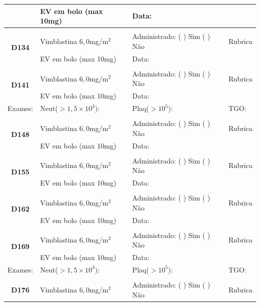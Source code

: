 \documentclass[11pt,a4paper,oldfontcommands]{memoir}
\begin{document}
\begin{center}
\begin{longtable}{p{1cm}p{5cm}|p{5cm}|p{3cm}}
    \multicolumn{1}{c|}{}&{EV em bolo (max 10mg)}&{Data:}&\\
    \hline
    \\
    \hline
    \multicolumn{1}{c|}{\multirow{2}{*}{\textbf{D134}}}&{Vimblastina \(6,0\)mg/m\(^2\)}&{Administrado: (  ) Sim (  ) Não}&{Rubrica}\\
    \multicolumn{1}{c|}{}&{EV em bolo (max 10mg)}&{Data:}&\\
    \hline
    \\
    \hline
    \multicolumn{1}{c|}{\multirow{2}{*}{\textbf{D141}}}&{Vimblastina \(6,0\)mg/m\(^2\)}&{Administrado: (  ) Sim (  ) Não}&{Rubrica}\\
    \multicolumn{1}{c|}{}&{EV em bolo (max 10mg)}&{Data:}&\\
    \hline
    {\tiny{Exames:}}&{\tiny{Neut(\(>1,5\times10^3\)):}}&{\tiny{Plaq(\(>10^5\)):}}&{\tiny{TGO:}}
    \\
    \hline
    \\
    \hline
    \multicolumn{1}{c|}{\multirow{2}{*}{\textbf{D148}}}&{Vimblastina \(6,0\)mg/m\(^2\)}&{Administrado: (  ) Sim (  ) Não}&{Rubrica}\\
    \multicolumn{1}{c|}{}&{EV em bolo (max 10mg)}&{Data:}&\\
    \hline
    \\
    \hline
    \multicolumn{1}{c|}{\multirow{2}{*}{\textbf{D155}}}&{Vimblastina \(6,0\)mg/m\(^2\)}&{Administrado: (  ) Sim (  ) Não}&{Rubrica}\\
    \multicolumn{1}{c|}{}&{EV em bolo (max 10mg)}&{Data:}&\\
    \hline
    \\
    \hline
    \multicolumn{1}{c|}{\multirow{2}{*}{\textbf{D162}}}&{Vimblastina \(6,0\)mg/m\(^2\)}&{Administrado: (  ) Sim (  ) Não}&{Rubrica}\\
    \multicolumn{1}{c|}{}&{EV em bolo (max 10mg)}&{Data:}&\\
    \hline
    \\
    \hline
    \multicolumn{1}{c|}{\multirow{2}{*}{\textbf{D169}}}&{Vimblastina \(6,0\)mg/m\(^2\)}&{Administrado: (  ) Sim (  ) Não}&{Rubrica}\\
    \multicolumn{1}{c|}{}&{EV em bolo (max 10mg)}&{Data:}&\\
    \hline
    {\tiny{Exames:}}&{\tiny{Neut(\(>1,5\times10^3\)):}}&{\tiny{Plaq(\(>10^5\)):}}&{\tiny{TGO:}}
    \\
    \hline
    \\
    \hline
    \multicolumn{1}{c|}{\multirow{2}{*}{\textbf{D176}}}&{Vimblastina \(6,0\)mg/m\(^2\)}&{Administrado: (  ) Sim (  ) Não}&{Rubrica}\\

\end{longtable}
\end{center}
\end{document}
